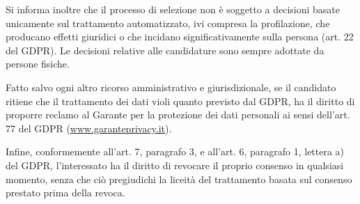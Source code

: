 \documentclass[legal]{polinetwork}
\begin{document}
Si informa inoltre che il processo di selezione non è soggetto a decisioni basate unicamente sul trattamento automatizzato, ivi compresa la profilazione, che producano effetti giuridici o che incidano significativamente sulla persona (art. 22 del GDPR). Le decisioni relative alle candidature sono sempre adottate da persone fisiche.

Fatto salvo ogni altro ricorso amministrativo e giurisdizionale, se il candidato ritiene che il trattamento dei dati violi quanto previsto dal GDPR, ha il diritto di proporre reclamo al Garante per la protezione dei dati personali ai sensi dell'art. 77 del GDPR (\href{https://www.garanteprivacy.it}{www.garanteprivacy.it}).

Infine, conformemente all'art. 7, paragrafo 3, e all'art. 6, paragrafo 1, lettera a) del GDPR, l'interessato ha il diritto di revocare il proprio consenso in qualsiasi momento, senza che ciò pregiudichi la liceità del trattamento basata sul consenso prestato prima della revoca.
\end{document}
